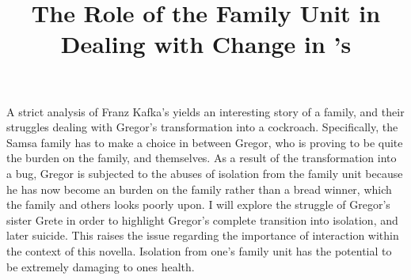 \documentclass{article}
\title{The Role of the Family Unit in Dealing with Change in
\citeauthor{kafka2007meta}'s \citetitle{kafka2007meta}}
\begin{document}
\makeheader





A strict analysis of Franz Kafka's  yields an
interesting story of a family, and their struggles dealing with Gregor's
transformation into a cockroach. Specifically, the Samsa family has to make
a choice in between Gregor, who is proving to be quite the burden on the
family, and themselves. As a result of the transformation into a bug, Gregor
is subjected to the abuses of isolation from the family unit because he has
now become an burden on the family rather than a bread winner, which the
family and others looks poorly upon. I will explore the struggle of Gregor's
sister Grete
in order to highlight Gregor's complete transition into
isolation, and later suicide. This raises the issue regarding the importance
of interaction within the context of this novella. Isolation from one's
family unit has the potential to be extremely damaging to ones health.

\end{document}
